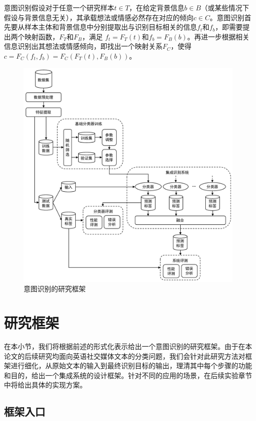 意图识别假设对于任意一个研究样本$t \in T$，在给定背景信息$b \in B$（或某些情况下假设与背景信息无关），其承载想法或情感必然存在对应的倾向$c \in C$。意图识别首先要从样本主体和背景信息中分别提取出与识别目标相关的信息$f_t$和$f_b$，即需要提出两个映射函数，$F_T$和$F_B$，满足 $f_t=F_T(t)$和$f_b=F_B(b)$。再进一步根据相关信息识别出其想法或情感倾向，即找出一个映射关系$F_C$，使得 $c=F_C(f_t, f_b)=F_C(F_T(t), F_B(b))$。

\begin{figure}[H]
  \centering
  \includegraphics[width=\textwidth]{img/framework.pdf}
  \caption{意图识别的研究框架}
  \label{fig:framework}
\end{figure}

\section{研究框架}
\label{sec:global_framework}

在本小节，我们将根据前述的形式化表示给出一个意图识别的研究框架。由于在本论文的后续研究均面向英语社交媒体文本的分类问题，我们会针对此研究方法对框架进行细化，从原始文本的输入到最终识别目标的输出，理清其中每个步骤的功能和目的，给出一个集成系统的设计框架。针对不同的应用的场景，在后续实验章节中将给出具体的实现方案。

\subsection{框架入口}

